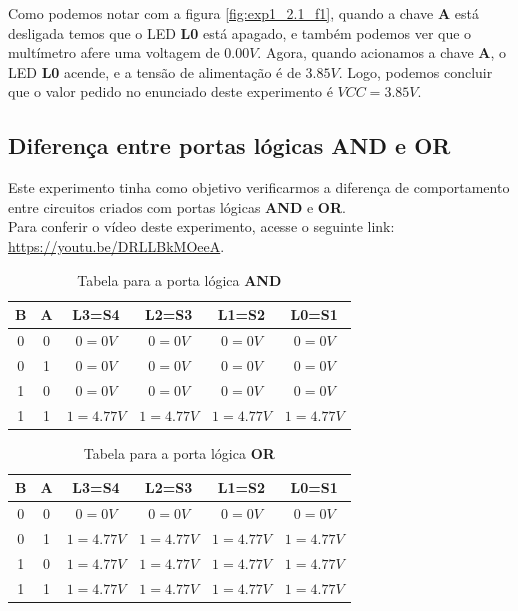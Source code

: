 \documentclass[12pt]{article}
\begin{document}
Como podemos notar com a figura \ref{fig:exp1_2.1_f1}, quando a chave \textbf{A}
está desligada temos que o LED \textbf{L0} está apagado, e também podemos ver
que o multímetro afere uma voltagem de \( 0.00V \). Agora, quando acionamos a
chave \textbf{A}, o LED \textbf{L0} acende, e a tensão de alimentação é de
\( 3.85V \). Logo, podemos concluir que o valor pedido no enunciado deste
experimento é \( VCC = 3.85V \).
\\[2em]

\subsection{Diferença entre portas lógicas \textbf{AND} e \textbf{OR}}
\label{sec:and_e_or}

Este experimento tinha como objetivo verificarmos a diferença de comportamento
entre circuitos criados com portas lógicas \textbf{AND} e \textbf{OR}.\\
Para conferir o vídeo deste experimento, acesse o seguinte link:
\href{https://youtu.be/DRLLBkMOeeA}{https://youtu.be/DRLLBkMOeeA}.

\begin{table}[H]
    \centering
    \caption{Tabela para a porta lógica \textbf{AND}}
    \begin{tabular}{|c|c|c|c|c|c|}
    \hline
    \textbf{B} & \textbf{A} & \textbf{L3}=S4 & \textbf{L2}=S3 & \textbf{L1}=S2 & \textbf{L0}=S1 \\
    \hline
    0  & 0 & \(0 = 0V\) & \(0 = 0V\) & \(0 = 0V\) & \(0 = 0V\) \\
    \hline
    0  & 1 & \(0 = 0V\) & \(0 = 0V\) & \(0 = 0V\) & \(0 = 0V\) \\
    \hline
    1  & 0 & \(0 = 0V\) & \(0 = 0V\) & \(0 = 0V\) & \(0 = 0V\) \\
    \hline
    1  & 1 & \(1 = 4.77V\) & \(1 = 4.77V\) & \(1 = 4.77V\) & \(1 = 4.77V\) \\
    \hline
    \end{tabular}
    \label{tab:tabela_and}
\end{table}

\begin{table}[H]
    \centering
    \caption{Tabela para a porta lógica \textbf{OR}}
    \begin{tabular}{|c|c|c|c|c|c|}
    \hline
    \textbf{B} & \textbf{A} & \textbf{L3}=S4 & \textbf{L2}=S3 & \textbf{L1}=S2 & \textbf{L0}=S1 \\
    \hline
    0  & 0 & \(0 = 0V\) & \(0 = 0V\) & \(0 = 0V\) & \(0 = 0V\) \\
    \hline
    0  & 1 & \(1 = 4.77V\) & \(1 = 4.77V\) & \(1 = 4.77V\) & \(1 = 4.77V\) \\
    \hline
    1  & 0 & \(1 = 4.77V\) & \(1 = 4.77V\) & \(1 = 4.77V\) & \(1 = 4.77V\) \\
    \hline
    1  & 1 & \(1 = 4.77V\) & \(1 = 4.77V\) & \(1 = 4.77V\) & \(1 = 4.77V\) \\
    \hline
    \end{tabular}
    \label{tab:tabela_or}
\end{table}
\end{document}
